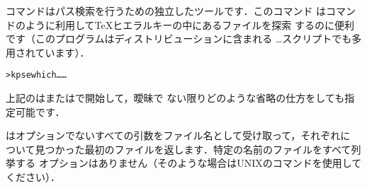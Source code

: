 \documentclass[uplatex,dvipdfmx,tombow]{jsarticle}
\begin{document}
コマンドはパス検索を行うための独立したツールです．このコマンド
はコマンドのように利用して\TeX ヒエラルキーの中にあるファイルを探索
するのに便利です（このプログラムはディストリビューションに含まれる%
\dots スクリプトでも多用されています）．
%
\begin{alltt}
> kpsewhich \dots{} \dots{}
\end{alltt}

上記のは\samp{\sopt{}}または\samp{\lopt{}}で開始して，曖昧で
ない限りどのような省略の仕方をしても指定可能です．

\KPS はオプションでないすべての引数をファイル名として受け取って，それぞれに
ついて見つかった最初のファイルを返します．特定の名前のファイルをすべて列挙する
オプションはありません（そのような場合はUNIXのコマンドを使用して
ください）．
\end{document}
